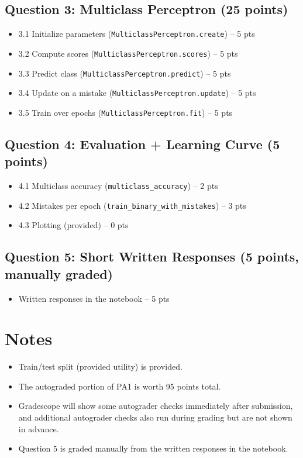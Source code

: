 \documentclass[11pt]{article}
\begin{document}
\subsection*{Question 3: Multiclass Perceptron (25 points)}
\begin{itemize}[leftmargin=1.25em]
  \item 3.1 Initialize parameters (\texttt{MulticlassPerceptron.create}) -- 5 pts
  \item 3.2 Compute scores (\texttt{MulticlassPerceptron.scores}) -- 5 pts
  \item 3.3 Predict class (\texttt{MulticlassPerceptron.predict}) -- 5 pts
  \item 3.4 Update on a mistake (\texttt{MulticlassPerceptron.update}) -- 5 pts
  \item 3.5 Train over epochs (\texttt{MulticlassPerceptron.fit}) -- 5 pts
\end{itemize}

\subsection*{Question 4: Evaluation + Learning Curve (5 points)}
\begin{itemize}[leftmargin=1.25em]
  \item 4.1 Multiclass accuracy (\texttt{multiclass\_accuracy}) -- 2 pts
  \item 4.2 Mistakes per epoch (\texttt{train\_binary\_with\_mistakes}) -- 3 pts
  \item 4.3 Plotting (provided) -- 0 pts
\end{itemize}

\subsection*{Question 5: Short Written Responses (5 points, manually graded)}
\begin{itemize}[leftmargin=1.25em]
  \item Written responses in the notebook -- 5 pts
\end{itemize}

\section*{Notes}
\begin{itemize}[leftmargin=1.25em]
  \item Train/test split (provided utility) is provided.
  \item The autograded portion of PA1 is worth 95 points total.
  \item Gradescope will show some autograder checks immediately after submission, and additional autograder checks also run during grading but are not shown in advance.
  \item Question 5 is graded manually from the written responses in the notebook.
\end{itemize}
\end{document}
